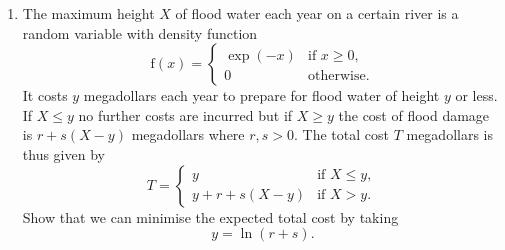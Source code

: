 \documentclass[a4, 11pt]{report}
\newlength{\qspace}
\newcounter{qnumber}
\newenvironment{question}%
 {\vspace{\qspace}
  \begin{enumerate}[\bfseries 1\quad][10]%
    \setcounter{enumi}{\value{qnumber}}%
    \item%
 }
{
  \end{enumerate}
  \filbreak
  \stepcounter{qnumber}
 }
\begin{document}
\begin{question}
The maximum height $X$ of flood water 
each year on a certain
river is a random variable with density function
\begin{equation*}
{\mathrm f}(x)=
\begin{cases}
\exp(-x)&\text{if $x\geqslant 0$,}\\
0&\text{otherwise}.
\end{cases}
\end{equation*}
It costs $y$ megadollars each year
to prepare for flood water
of height $y$ or less. If $X\leqslant y$ 
no further costs are incurred
but if $X\geqslant y$ the cost of flood damage 
is $r+s(X-y)$ megadollars where $r,s>0$. 
The total cost $T$ megadollars is thus
given by
\begin{equation*}
T=
\begin{cases}
y&\text{if $X\leqslant y$},\\
y+r+s(X-y)&\text{if $X>y$}.
\end{cases}
\end{equation*}
Show that we can minimise the expected total cost
by taking 
\[y=\ln(r+s).\]
\end{question}
	
\end{document}
